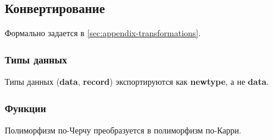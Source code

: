 \subsection{Конвертирование}

Формально задается в \ref{sec:appendix-transformations}.

\subsubsection{Типы данных}

Типы данных (\textbf{data}, \textbf{record}) экспортируются как \textbf{newtype},
а не \textbf{data}.

\subsubsection{Функции}

Полиморфизм по-Черчу преобразуется в полиморфизм по-Карри.
